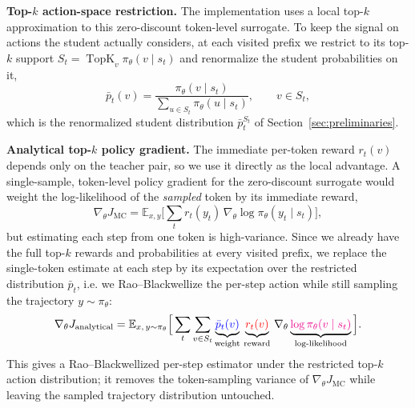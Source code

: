 \textbf{Top-$k$ action-space restriction.}
The implementation uses a local top-$k$ approximation to this zero-discount
token-level surrogate. To keep the signal on actions the student actually
considers, at each visited prefix we restrict to its top-$k$ support
$S_t=\operatorname{TopK}_v \pi_\theta(v\mid s_t)$ and renormalize the student
probabilities on it,
\begin{equation}
    \bar p_t(v) =
    \frac{\pi_\theta(v\mid s_t)}
    {\sum_{u\in S_t}\pi_\theta(u\mid s_t)},
    \qquad v\in S_t,
\end{equation}
which is the renormalized student distribution $\bar p_t^{S_t}$ of
Section~\ref{sec:preliminaries}.

\textbf{Analytical top-$k$ policy gradient.}
The immediate per-token reward $r_t(v)$ depends only on the teacher pair, so we
use it directly as the local advantage. A single-sample, token-level policy
gradient for the zero-discount surrogate would weight the log-likelihood of the
\emph{sampled} token by its immediate reward,
\begin{equation}
    \nabla_\theta J_{\mathrm{MC}} =
    \mathbb{E}_{x, y} \Big[
    \textstyle\sum_t r_t(y_t)\,
    \nabla_\theta \log \pi_\theta(y_t \mid s_t)
    \Big],
\end{equation}
but estimating each step from one token is high-variance. Since we already have
the full top-$k$ rewards and probabilities at every visited prefix, we replace
the single-token estimate at each step by its expectation over the restricted
distribution $\bar p_t$, i.e. we Rao--Blackwellize the per-step action while
still sampling the trajectory $y\sim\pi_\theta$:
\begin{equation}
    \nabla_\theta J_{\mathrm{analytical}} =
    \mathbb{E}_{x,\, y\sim\pi_\theta} \Big[
    \sum_t \sum_{v \in S_t}
    \underbrace{\textcolor{blue}{\bar p_t(v)}}_{\text{weight}} \,
    \underbrace{\textcolor{red}{r_t(v)}}_{\text{reward}} \,
    \nabla_\theta
    \underbrace{\textcolor{magenta}{\log \pi_\theta(v \mid s_t)}}_{\text{log-likelihood}}
    \Big].
\end{equation}
This gives a Rao--Blackwellized per-step estimator under the restricted top-$k$
action distribution; it removes the token-sampling variance of
$\nabla_\theta J_{\mathrm{MC}}$ while leaving the sampled trajectory distribution
untouched.

